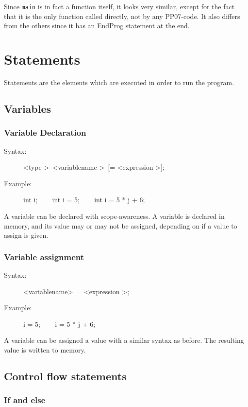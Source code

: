 \documentclass[10pt,a4paper]{report}
\begin{document}
Since \texttt{main} is in fact a function itself, it looks very similar, except for the fact that it is the only function called directly, not by any PP07-code. It also differs from the others since it has an EndProg statement at the end.

\section{Statements}
Statements are the elements which are executed in order to run the program.

\subsection{Variables}

\subsubsection*{Variable Declaration}
\begin{description}
	\item[Syntax:] 
		\textless type \textgreater ~\textless variablename \textgreater ~[= \textless expression \textgreater];
	\item[Example:] 
		int i; ~~~ 
		int i = 5;  ~~~ 
		int i = 5 * j + 6;
\end{description} 
A variable can be declared with scope-awareness. A variable is declared in memory, and its value may or may not be assigned, depending on if a value to assign is given.

\subsubsection*{Variable assignment}

\begin{description}
	\item[Syntax:] 
		\textless variablename\textgreater ~= \textless expression \textgreater;
	\item[Example:] 
		i = 5; ~~~ 
		i = 5 * j + 6;
\end{description} 
A variable can be assigned a value with a similar syntax as before. The resulting value is written to memory.

\subsection{Control flow statements}

\subsubsection*{If and else}
\end{document}
